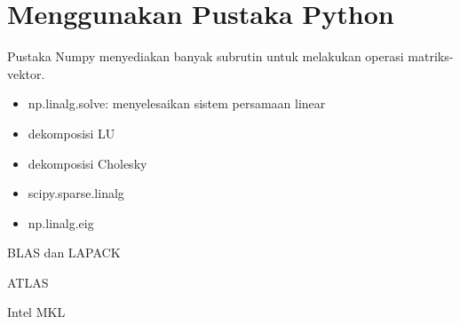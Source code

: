 \section{Menggunakan Pustaka Python}

Pustaka Numpy menyediakan banyak subrutin untuk melakukan operasi matriks-vektor.

\begin{itemize}
\item np.linalg.solve: menyelesaikan sistem persamaan linear
\item dekomposisi LU
\item dekomposisi Cholesky
\item scipy.sparse.linalg
\item np.linalg.eig
\end{itemize}

BLAS dan LAPACK

ATLAS

Intel MKL
